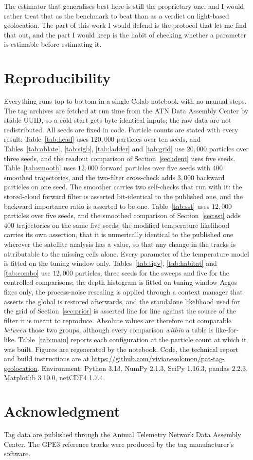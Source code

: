 \documentclass[conference]{IEEEtran}
\begin{document}
The estimator that generalises best here is still the proprietary one, and I
would rather treat that as the benchmark to beat than as a verdict on
light-based geolocation. The part of this
work I would defend is the protocol that let me find that out, and the part I
would keep is the habit of checking whether a parameter is estimable before
estimating it.

\section*{Reproducibility}
Everything runs top to bottom in a single Colab notebook with no manual steps.
The tag archives are fetched at run time from the ATN Data Assembly Center by
stable UUID, so a cold start gets byte-identical inputs; the raw data are not
redistributed. All seeds are fixed in code. Particle counts are stated with every
result: Table~\ref{tab:head} uses $120{,}000$ particles over ten seeds, and
Tables~\ref{tab:ablate}, \ref{tab:sigb}, \ref{tab:ladder} and
\ref{tab:grid} use $20{,}000$ particles over three seeds, and the readout
comparison of Section~\ref{sec:ident} uses five seeds. Table~\ref{tab:smooth}
uses $12{,}000$ forward particles over five seeds with $400$ smoothed
trajectories, and the two-filter cross-check adds $3{,}000$ backward particles
on one seed. The smoother carries two self-checks that run with it: the
stored-cloud forward filter is asserted bit-identical to the published one, and
the backward importance ratio is asserted to be one. Table~\ref{tab:sst} uses $12{,}000$ particles over five seeds, and the smoothed comparison of Section~\ref{sec:sst} adds $400$ trajectories on the same five seeds; the modified temperature likelihood carries its own assertion, that it is numerically identical to the published one wherever the satellite analysis has a value, so that any change in the tracks is attributable to the missing cells alone. Every parameter of the temperature model is fitted on the tuning window only. Tables~\ref{tab:sigv}, \ref{tab:habitat} and
\ref{tab:combo} use $12{,}000$ particles, three seeds for the sweeps and five
for the controlled comparisons; the depth histogram is fitted on tuning-window
Argos fixes only, the process-noise rescaling is applied through a context
manager that asserts the global is restored afterwards, and the standalone
likelihood used for the grid of Section~\ref{sec:prior} is asserted line for
line against the source of the filter it is meant to reproduce. Absolute values are therefore not comparable
\emph{between} those two groups, although every comparison \emph{within} a
table is like-for-like. Table~\ref{tab:main} reports each configuration at the
particle count at which it was built.
Figures are regenerated by the notebook. Code, the technical report and build
instructions are at
\url{https://github.com/vivianesolomon/pat-tag-geolocation}.
Environment: Python 3.13, NumPy 2.1.3, SciPy 1.16.3, pandas 2.2.3,
Matplotlib 3.10.0, netCDF4 1.7.4.

\section*{Acknowledgment}
Tag data are published through the Animal Telemetry Network Data Assembly Center.
The GPE3 reference tracks were produced by the tag manufacturer's software.
\end{document}

